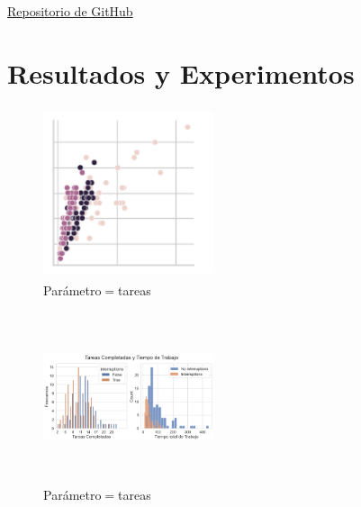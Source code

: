 \documentclass[10pt,a4paper,twocolumn]{article}
\begin{document}
\href{https://github.com/roo1202/Discrete-Event-Simulation-person-working}{Repositorio de GitHub}

\section{Resultados y Experimentos} 

\begin{figure}[H] %
    \centering %
    \includegraphics[width=5cm, height=5cm]{Tareas_tiempotareas.png} %
    \caption{Par\'ametro$ = $tareas} %
    \label{fig:mi_imagen4} %
\end{figure}

\begin{figure}[H] %
    \centering %
    \includegraphics[width=5cm, height=5cm]{tareas_interrupciones.png} %
    \caption{Par\'ametro$ = $tareas} %
    \label{fig:mi_imagen5} %
\end{figure}
\end{document}

